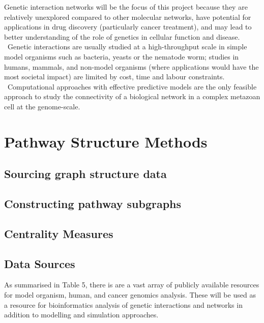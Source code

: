 Genetic interaction networks will be the focus of this project because they are relatively unexplored compared to other molecular networks, have potential for applications in drug discovery (particularly cancer treatment), and may lead to better understanding of the role of genetics in cellular function and disease. \ Genetic interactions are usually studied at a high-throughput scale in simple model organisms such as bacteria, yeasts or the nematode worm; studies in humans, mammals, and non-model organisms (where applications would have the most societal impact) are limited by cost, time and labour constraints. \ Computational approaches with effective predictive models are the only feasible approach to study the connectivity of a biological network in a complex metazoan cell at the genome-scale.


\section{Pathway Structure Methods}
\subsection{Sourcing graph structure data}
\subsection{Constructing pathway subgraphs}
\subsection{Centrality Measures}


\subsection[Data Sources]{Data Sources}

As summarised in Table 5, there is are a vast array of publicly available resources for model organism, human, and cancer genomics analysis. These will be used as a resource for bioinformatics analysis of genetic interactions and networks in addition to modelling and simulation approaches.  


